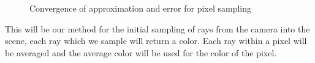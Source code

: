 \documentclass[../pbr.tex]{subfile}
\begin{document}
\begin{figure}[htpb]
  \begin{center}
  \end{center}
  \caption{Convergence of approximation and error for pixel sampling}%
  \label{fig:p1_spp_approx}
\end{figure}

This will be our method for the initial sampling of rays from the camera into
the scene, each ray which we sample will return a color. Each ray within a
pixel will be averaged and the average color will be used for the color of the
pixel.
\end{document}
